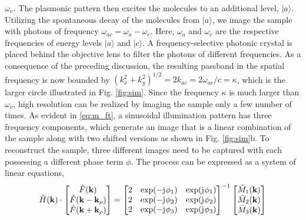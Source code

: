 \documentclass[10pt]{article}
\renewcommand{\v}[1]{\mathbf{#1}} %
\newcommand{\ti}[1]{\tilde{#1}} %
\renewcommand{\^}{\hat}  %
\renewcommand{\O}{\omega}  %
\newcommand{\p}{\rho}  %
\renewcommand{\^}{\hat}  %
\renewcommand{\j}{\mathrm{j}\mkern1mu} %
\begin{document}
$\O_{\upsilon}$. The plasmonic pattern then excites the molecules to an
additional level, $|a\rangle$. Utilizing the spontaneous decay of the molecules from $|a\rangle$, we image the sample with photons of frequency $\O_{ac} = \O_{a}-\O_{c}$. Here, $\O_{a}$ and $\O_{c}$ are the respective frequencies of energy levels $|a\rangle$ and $|c\rangle$. A frequency-selective photonic crystal is placed behind the objective lens to filter the photons of different frequencies. As a consequence of the preceding discussion, the resulting passband in the spatial frequency is now bounded by $(k_x^2 + k_y^2)^{1/2} = 2 k_{ac} = 2 \O_{ac}/c = \kappa$, which is the larger circle illustrated in Fig. \ref{fig:sim}. Since the frequency $\kappa$ is much larger than $\O_{\nu}$, high resolution can be realized by imaging the sample only a few number of times.
%
As evident in \eqref{eq:m_ft}, a sinusoidal illumination pattern has three frequency components, which generate an image that is a linear combination of the sample along with two shifted versions as shown in Fig. \ref{fig:sim}b. To reconstruct the sample, three different images need to be captured with each possessing a different phase term $\phi$. The process can be expressed as a system of linear equations,
%
\begin{equation}
  \ti H(\v k) \cdot
  \begin{bmatrix}
    \ti F(\v k) \\
    \ti F(\v k - \v k_{\p}) \\
    \ti F(\v k + \v k_{\p})
  \end{bmatrix}
  =
  \begin{bmatrix}
    2 & \exp(- \j \phi_1) & \exp( \j \phi_1) \\
    2 & \exp(- \j \phi_2) & \exp( \j \phi_2) \\
    2 & \exp(- \j \phi_3) & \exp( \j \phi_3)
  \end{bmatrix}^{-1}
  \begin{bmatrix}
   \ti M_1(\v k) \\
   \ti M_2(\v k) \\
   \ti M_3(\v k)
  \end{bmatrix}
  \label{eq:reconstruction_algo}
\end{equation}
%
\end{document}
